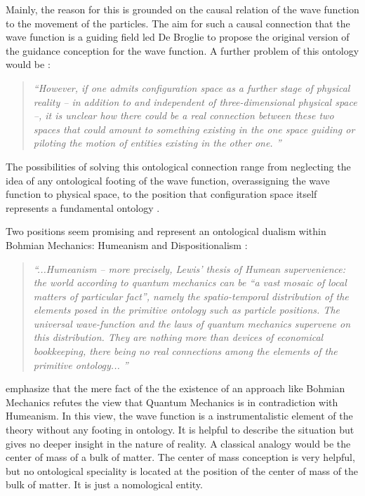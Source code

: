 \documentclass{article}
\begin{document}
Mainly, the reason for this is grounded on the causal relation of the wave function to the movement of the particles. The aim for such a causal connection that the wave function is a guiding field led De Broglie to propose the original version of the guidance conception for the wave function. A further problem of this ontology would be \cite[p.7]{esfeld2013ontology}:

\begin{quote}
\textit{``However, if one admits configuration space as a further stage of physical reality – in addition to and independent of three-dimensional physical space –, it is unclear how there could be a real connection between these two spaces that could amount to something existing in the one space guiding or piloting the motion of entities existing in the other one. ''}
\end{quote}

The possibilities of solving this ontological connection range from neglecting the idea of any ontological footing of the wave function, overassigning the wave function to  physical space, to the position that configuration space itself represents a fundamental ontology \cite[p.7]{esfeld2013ontology}.

Two positions seem promising and represent an ontological dualism within Bohmian Mechanics: Humeanism and Dispositionalism \cite[p.25]{esfeld2013ontology}: 

\begin{quote}
\textit{``...Humeanism – more precisely, Lewis’ thesis of Humean supervenience: the world according to quantum mechanics can be “a vast mosaic of local matters of particular fact”, namely the spatio-temporal distribution of the elements posed in the primitive ontology such as particle positions. The universal wave-function and the laws of quantum mechanics supervene on this distribution. They are nothing more than devices of economical bookkeeping, there being no real connections among the elements of the primitive ontology... ''}
\end{quote}

\cite[]{esfeld2013ontology} emphasize that the mere fact of the the existence of an approach like Bohmian Mechanics refutes the view that Quantum Mechanics is in contradiction with Humeanism. In this view, the wave function is a instrumentalistic element of the theory without any footing in ontology. It is helpful to describe the situation but gives no deeper insight in the nature of reality. A classical analogy would be the center of mass of a bulk of matter. The center of mass conception is very helpful, but no ontological speciality is located at the position of the center of mass of the bulk of matter. It is just a nomological entity. \newline
\end{document}
